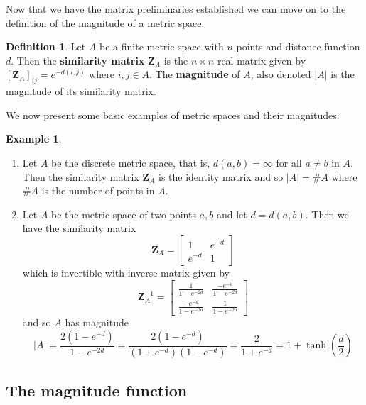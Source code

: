 \documentclass[11pt]{article}
\theoremstyle{definition}
\newtheorem{defn}{Definition}
\theoremstyle{definition}
\newtheorem*{ex}{Example}
\theoremstyle{plain}
\theoremstyle{plain}
\theoremstyle{plain}
\theoremstyle{definition}
\begin{document}
Now that we have the matrix preliminaries established we can move on to the definition of the magnitude of a metric space.

\begin{defn}
Let $A$ be a finite metric space with $n$ points and distance function $d$. Then the \textbf{similarity matrix} $\mathbf{Z}_A$ is the $n\times n$ real matrix given by $[\mathbf{Z}_A]_{ij} = e^{-d(i,j)}$ where $i,j \in A$. The \textbf{magnitude} of $A$, also denoted $\vert A \vert$ is the magnitude of its similarity matrix. 
\end{defn}

We now present some basic examples of metric spaces and their magnitudes:

\begin{ex}
\begin{enumerate}
\item Let $A$ be the discrete metric space, that is, $d(a,b) = \infty$ for all $a \neq b$ in $A$. Then the similarity matrix $\mathbf{Z}_A$ is the identity matrix and so $\vert A \vert = \#A$ where $\#A$ is the number of points in $A$.
\item Let $A$ be the metric space of two points $a,b$ and let $d = d(a,b)$. Then we have the similarity matrix
\begin{equation*}
\mathbf{Z}_A = \begin{bmatrix} 1 & e^{-d} \\ e^{-d} & 1 \end{bmatrix}
\end{equation*}
which is invertible with inverse matrix given by
\begin{equation*}
\mathbf{Z}_A^{-1} = \begin{bmatrix} \frac{1}{1-e^{-2d}} & \frac{-e^{-d}}{1-e^{-2d}} \\ \frac{-e^{-d}}{1-e^{-2d}} & \frac{1}{1-e^{-2d}} \end{bmatrix}
\end{equation*}
and so $A$ has magnitude
\begin{equation*}
\vert A \vert = \frac{2(1-e^{-d})}{1-e^{-2d}} = \frac{2(1-e^{-d})}{(1+e^{-d})(1-e^{-d})} = \frac{2}{1+e^{-d}} = 1+\tanh{\left(\frac{d}{2}\right)}
\end{equation*}
\end{enumerate}
\end{ex}

\subsection{The magnitude function}
\end{document}
